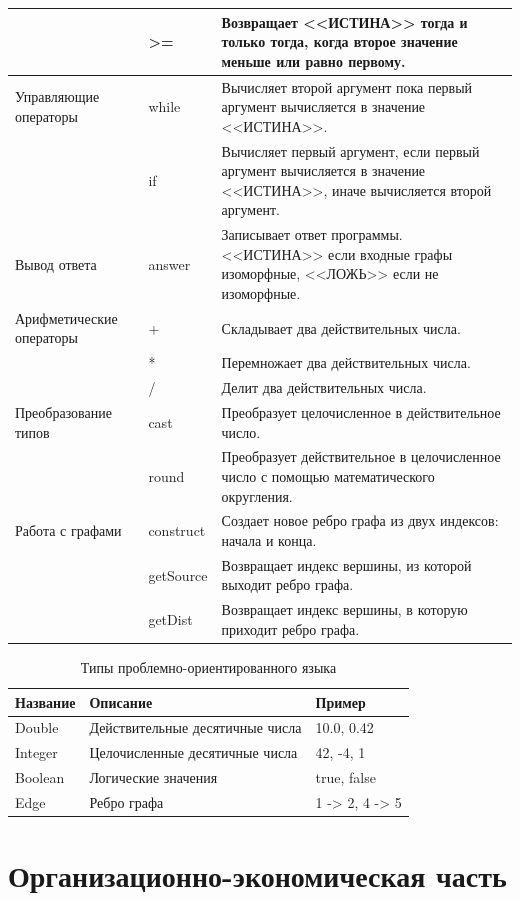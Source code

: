 \documentclass[russian,utf8,emptystyle]{eskdtext}
\begin{document}
\begin{spacing}{1.5}
\begin{longtable}{p{4cm}|p{3cm}|p{7cm}}
  & >= & Возвращает <<ИСТИНА>> тогда и только тогда, когда второе значение меньше или равно первому. \\
\hline
Управляющие операторы 
  & while & Вычисляет второй аргумент пока первый аргумент вычисляется в значение <<ИСТИНА>>. \\
  & if    & Вычисляет первый аргумент, если первый аргумент вычисляется в значение <<ИСТИНА>>, иначе вычисляется второй аргумент. \\
\hline
Вывод ответа 
  & answer & Записывает ответ программы. <<ИСТИНА>> если входные графы изоморфные, <<ЛОЖЬ>> если не изоморфные. \\
Арифметические операторы 
  & + & Складывает два действительных числа. \\
  & * & Перемножает два действительных числа. \\
  & / & Делит два действительных числа. \\
\hline
Преобразование типов 
  & cast & Преобразует целочисленное в действительное число. \\
  & round & Преобразует действительное в целочисленное число с помощью математического округления. \\
\hline
Работа с графами 
  & construct & Создает новое ребро графа из двух индексов: начала и конца. \\
  & getSource & Возвращает индекс вершины, из которой выходит ребро графа. \\
  & getDist   & Возвращает индекс вершины, в которую приходит ребро графа. 
\end{longtable} 

\begin{longtable}{p{5cm}|p{5cm}|p{3cm}}
\caption{Типы проблемно-ориентированного языка}
\label{tab:dsl_types} \\
Название & Описание & Пример \\ 
\hline 
Double & Действительные десятичные числа & 10.0, 0.42 \\
Integer& Целочисленные десятичные числа & 42, -4, 1 \\
Boolean& Логические значения & true, false \\
Edge   & Ребро графа         & 1 -> 2, 4 -> 5 

\end{longtable} 

\newpage
\section{Организационно-экономическая часть}

\end{spacing}
\end{document}
